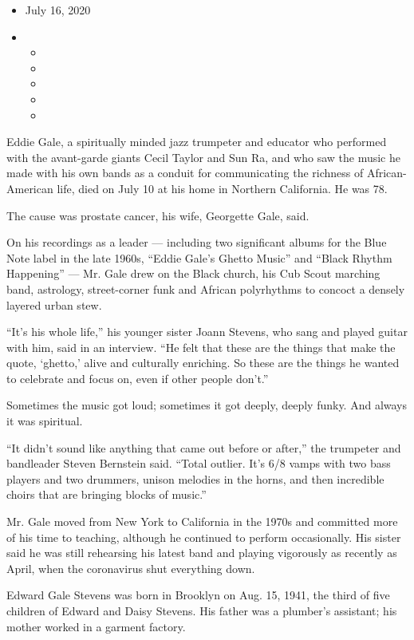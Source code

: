 \begin{itemize}
\item
  July 16, 2020
\item
  \begin{itemize}
  \item
  \item
  \item
  \item
  \item
  \end{itemize}
\end{itemize}

Eddie Gale, a spiritually minded jazz trumpeter and educator who
performed with the avant-garde giants Cecil Taylor and Sun Ra, and who
saw the music he made with his own bands as a conduit for communicating
the richness of African-American life, died on July 10 at his home in
Northern California. He was 78.

The cause was prostate cancer, his wife, Georgette Gale, said.

On his recordings as a leader --- including two significant albums for
the Blue Note label in the late 1960s, ``Eddie Gale's Ghetto Music'' and
``Black Rhythm Happening'' --- Mr. Gale drew on the Black church, his
Cub Scout marching band, astrology, street-corner funk and African
polyrhythms to concoct a densely layered urban stew.

``It's his whole life,'' his younger sister Joann Stevens, who sang and
played guitar with him, said in an interview. ``He felt that these are
the things that make the quote, `ghetto,' alive and culturally
enriching. So these are the things he wanted to celebrate and focus on,
even if other people don't.''

Sometimes the music got loud; sometimes it got deeply, deeply funky. And
always it was spiritual.

``It didn't sound like anything that came out before or after,'' the
trumpeter and bandleader Steven Bernstein said. ``Total outlier. It's
6/8 vamps with two bass players and two drummers, unison melodies in the
horns, and then incredible choirs that are bringing blocks of music.''

Mr. Gale moved from New York to California in the 1970s and committed
more of his time to teaching, although he continued to perform
occasionally. His sister said he was still rehearsing his latest band
and playing vigorously as recently as April, when the coronavirus shut
everything down.

Edward Gale Stevens was born in Brooklyn on Aug. 15, 1941, the third of
five children of Edward and Daisy Stevens. His father was a plumber's
assistant; his mother worked in a garment factory.

